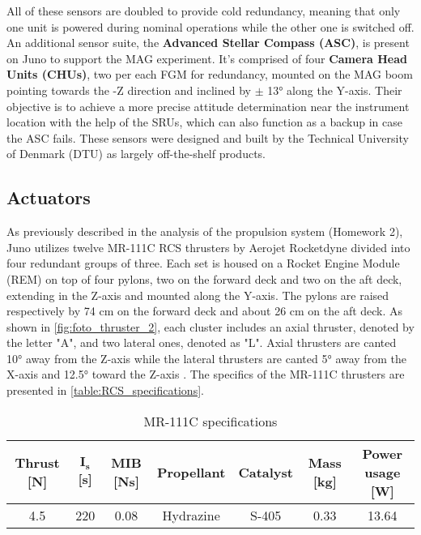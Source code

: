 All of these sensors are doubled to provide cold redundancy, meaning that only one unit is powered during nominal operations while the other one is switched off.
An additional sensor suite, the \textbf{Advanced Stellar Compass (ASC)}, is present on Juno to support the MAG experiment. It's comprised of four \textbf{Camera Head Units (CHUs)}, two per each FGM for redundancy, mounted on the MAG boom pointing towards the -Z direction and inclined by $\pm$ 13° along the Y-axis. Their objective is to achieve a more precise attitude determination near the instrument location with the help of the SRUs, which can also function as a backup in case the ASC fails. These sensors were designed and built by the Technical University of Denmark (DTU) as largely off-the-shelf products. \cite{ASC_details}

\subsection{Actuators}
\label{subsec:Actuators}

As previously described in the analysis of the propulsion system (Homework 2), Juno utilizes twelve MR-111C RCS thrusters by Aerojet Rocketdyne \cite{RCS_info} divided into four redundant groups of three.
Each set is housed on a Rocket Engine Module (REM) on top of four pylons, two on the forward deck and two on the aft deck, extending in the Z-axis and mounted along the Y-axis.
The pylons are raised respectively by 74 cm on the forward deck and about 26 cm on the aft deck. As shown in \autoref{fig:foto_thruster_2}, each cluster includes an axial thruster, denoted by the letter "A", and two lateral ones, denoted as "L".
Axial thrusters are canted 10° away from the Z-axis while the lateral thrusters are canted 5° away from the X-axis and 12.5° toward the Z-axis \cite{juno_inner}. The specifics of the MR-111C thrusters are presented in \autoref{table:RCS_specifications}. \cite{RCS_values}

\begin{table}[H]
    \renewcommand{\arraystretch}{1.3}
    \centering
    \small
    \begin{tabular}{|c|c|c|c|c|c|c|}
        \hline
        \textbf{Thrust [N]} & \textbf{$\boldsymbol{I_{s}}$ [s]} & \textbf{MIB [Ns]} & \textbf{Propellant} & \textbf{Catalyst} & \textbf{Mass [kg]} & \textbf{Power usage [W]} \\
        \hline
        \hline
        4.5 & 220 & 0.08 & Hydrazine & S-405 & 0.33 & 13.64 \\
        \hline
    \end{tabular}
    \caption{MR-111C specifications}
    \label{table:RCS_specifications}
\end{table}
\vspace*{-3mm}

